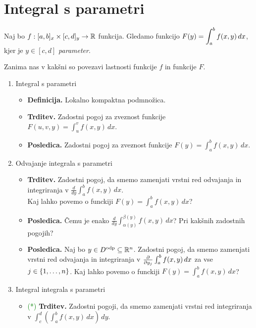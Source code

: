 \section{Integral s parametri}
Naj bo $f:[a,b]_x \times [c,d]_y \to \mathbb{R}$ funkcija. Gledamo funkcijo $\displaystyle F(y) = \int_{a}^{b}f(x,y) \, dx$, kjer je $y \in [c,d]$ \emph{parameter}.

Zanima nas v kakšni so povezavi lastnosti funkcije $f$ in funkcije $F$.

\begin{enumerate}
    \item Integral s parametri
    \begin{itemize}
        \item \textbf{Definicija.} Lokalno kompaktna podmnožica.
        \item \textbf{Trditev.} Zadostni pogoj za zveznost funkcije $F(u,v,y) = \int_{u}^{v}f(x,y) \, dx$.
        \item \textbf{Posledica.} Zadostni pogoj za zveznost funkcije $F(y) = \int_{a}^{b}f(x,y) \, dx$.
    \end{itemize}
    \item Odvajanje integrala s parametri
    \begin{itemize}
        \item \textbf{Trditev.} Zadostni pogoj, da smemo zamenjati vrstni red odvajanja in integriranja v \(\frac{d}{dy} \int_{a}^{b}f(x,y) \, dx\). \\ Kaj lahko povemo o funckiji $F(y) = \int_{a}^{b}f(x,y) \, dx$?
        \item \textbf{Posledica.} Čemu je enako \(\frac{d}{dy} \int_{\alpha(y)}^{\beta(y)}f(x,y) \, dx\)? Pri kakšnih zadostnih pogojih?
        \item \textbf{Posledica.} Naj bo \(y \in D^\text{odp} \subseteq \mathbb{R}^n\). Zadostni pogoj, da smemo zamenjati vrstni red odvajanja in integriranja v \(\frac{\partial }{\partial y_j} \int_{a}^{b}f(x,y) \, dx\) za vse \(j \in \left\{1, \ldots, n\right\}\).  Kaj lahko povemo o funckiji $F(y) = \int_{a}^{b}f(x,y) \, dx$?
    \end{itemize}

    \item Integral integrala s parametri
    \begin{itemize}
        \item \textcolor{green}{(*)} \textbf{Trditev.} Zadostni pogoji, da smemo zamenjati vrstni red integriranja v \(\int_{c}^{d} \left(\int_{a}^{b} f(x,y) \,dx \right) \,dy\).
    \end{itemize}


\end{enumerate}
